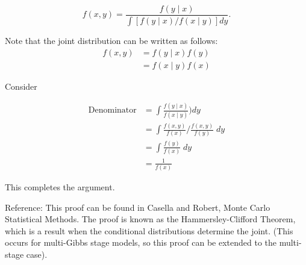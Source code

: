 \documentclass{article}
\begin{document}
\begin{enumerate}
$$f(x,y) = 
\frac{f(y \mid x)}
{\int [ f(y\mid x)/f(x \mid y) ]dy}.$$





Note that the joint distribution can be written as follows:
\begin{align}
f(x,y) &= f(y \mid x)f(y)  \\
&= f(x \mid y)f(x) 
\end{align}

Consider 

\begin{align}
\text{Denominator} &=
\int \frac{f(y\mid x)}{f(x \mid y)}) dy\\
&=\int \frac{f(x,y)}{f(x)} /
 \frac{f(x,y)}{f(y)} \; dy\\
 & = \int \frac{f(y)}{f(x)} \; dy\\
 &= \frac{1}{f(x)}
\end{align}

This completes the argument.

%
%
%

Reference: This proof can be found in Casella and Robert, Monte Carlo Statistical Methods. The proof is known as the Hammersley-Clifford Theorem, which is a result when the  conditional distributions determine the joint. (This occurs for multi-Gibbs stage models, so this proof can be extended to the multi-stage case).


\end{enumerate}
\end{document}
